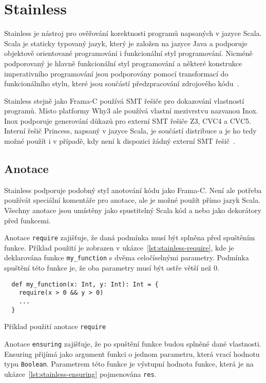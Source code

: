 \chapter{Stainless}
\label{ch:stainless}

Stainless je nástroj pro ověřování korektnosti programů napsaných v jazyce Scala.
Scala je staticky typovaný jazyk, který je založen na jazyce Java
a podporuje objektově orientované programování i funkcionální styl programování.
Nicméně podporovaný je hlavně funkcionální styl programování a některé konstrukce
imperativního programování jsou podporovány pomocí transformací do funkcionálního stylu,
které jsou součástí předzpracování zdrojového kódu~\cite{StainlessDocs}.

Stainless stejně jako Frama\mbox{-}C používá SMT řešiče pro dokazování vlastností programů.
Místo platformy Why3 ale používá vlastní mezivrstvu nazvanou Inox.
Inox podporuje generování důkazů pro externí SMT řešiče Z3, CVC4 a CVC5.
Interní řešič Princess, napsaný v jazyce Scala, je součástí distribuce a je ho tedy možné použít
i v případě, kdy není k dispozici žádný externí SMT řešič~\cite{InoxSolver}.

\section{Anotace}
\label{sec:stainless-annotations}

Stainless podporuje podobný styl anotování kódu jako Frama\mbox{-}C\@.
Není ale potřeba používát speciální komentáře pro anotace,
ale je možné použít přímo jazyk Scala.
Všechny anotace jsou umístěny jako spustitelný Scala kód a nebo jako dekorátory před funkcemi.

Anotace \texttt{require} zajišťuje, že daná podmínka musí být splněna před spuštěním funkce.
Příklad použití je zobrazen v ukázce~\ref{lst:stainless-require},
kde je deklarována funkce \texttt{my\_function} s dvěma celočíselnými parametry.
Podmínka spuštění této funkce je, že oba parametry musí být ostře větší než 0.

\begin{listing}[H]
  \begin{verbatim}
  def my_function(x: Int, y: Int): Int = {
    require(x > 0 && y > 0)
    ...
  }
  \end{verbatim}
  \caption{Příklad použití anotace \texttt{require}}
  \label{lst:stainless-require}
\end{listing}

Anotace \texttt{ensuring} zajišťuje, že po spuštění funkce budou splněné dané vlastnosti.
Ensuring přijímá jako argument funkci o jednom parametru,
která vrací hodnotu typu \texttt{Boolean}.
Parametrem této funkce je výstupní hodnota funkce,
která je na ukázce~\ref{lst:stainless-ensuring} pojmenována \texttt{res}.

